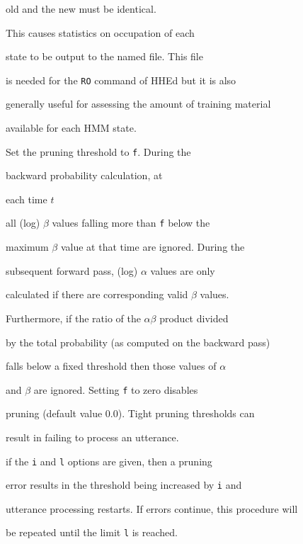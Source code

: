 \begin{optlist}
      old and the new must be identical.





   This causes statistics on occupation of each


      state to be output to the named file.  This file


      is needed for the {\tt RO} command of HHEd but it is also


      generally useful for assessing the amount of training material


      available for each HMM state.


      


   Set the pruning threshold to {\tt f}.  During the 


      backward probability calculation, at


      each time $t$ 


      all (log) $\beta$ values falling more than {\tt f} below the


      maximum $\beta$ value at that time are ignored.  During the


      subsequent forward pass, (log) $\alpha$ values are only


      calculated if there are corresponding valid $\beta$ values.


      Furthermore, if the ratio of the $ \alpha \beta $ product divided


      by the total probability (as computed on the backward pass)


      falls below a fixed threshold then those values of $\alpha$


      and $\beta$ are ignored. Setting {\tt f} to zero disables


      pruning  (default value 0.0).  Tight pruning thresholds can


       result in  failing to process an utterance.


      if the {\tt i} and {\tt l} options are given, then a pruning


      error results in the threshold being increased by {\tt i} and


      utterance processing restarts.  If errors continue, this procedure will 


      be repeated until the limit {\tt l} is reached.


      



\end{optlist}
